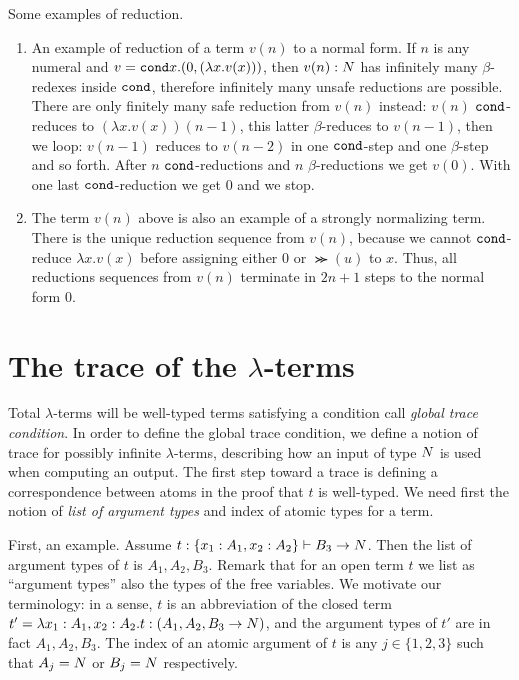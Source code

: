 \documentclass{article}
\begin{document}
Some examples of reduction.
\begin{enumerate}
\item
An example of reduction of a term $v(n)$ to a normal form. 
If $n$ is any numeral and $v = {\tt cond} x. (0, (\lambda x.v(x)) )$, then 
$v(n): {N}$ has infinitely many $\beta$-redexes inside 
${\tt cond}$, therefore infinitely many unsafe reductions are possible. There are only finitely many safe reduction
from $v(n)$ instead: $v(n)$ ${\tt cond}$-reduces to $(\lambda x.v(x))(n-1)$, 
this latter $\beta$-reduces to $v(n-1)$, 
then we loop: $v(n-1)$ reduces to $v(n-2)$ in one ${\tt cond}$-step and one $\beta$-step and so forth.
After $n$ ${\tt cond}$-reductions and 
$n$ $\beta$-reductions we get $v(0)$. With one last ${\tt cond}$-reduction we get $0$ and we stop. 
\item
The term $v(n)$ above is also an example of a strongly normalizing term.
There is the unique reduction sequence from $v(n)$, because we cannot ${\tt cond}$-reduce $\lambda x.v(x)$
before assigning either $0$ or $\Succ(u)$ to $x$. 
Thus, all reductions sequences from $v(n)$ terminate in $2n+1$ steps to the normal form $0$.
\end{enumerate}


\section{The trace of the $\lambda$-terms}
Total $\lambda$-terms will be well-typed terms satisfying a condition call \emph{global trace condition}.
In order to define the global trace condition, 
we define a notion of trace for possibly infinite $\lambda$-terms, describing how an input of type ${N}$
is used when computing an output.
The first step toward a trace is defining a correspondence between atoms in the
proof that $t$ is well-typed. We need first the notion of \emph{list of argument
 types} and index of atomic types for a term.

First, an example.
Assume $t : \{x_1:A_1, x_2:A_2\} \vdash B_3 \rightarrow {N}$. Then the list of argument types of $t$
is $A_1, A_2, B_3$. Remark that for an open term $t$ we list as ``argument types'' also the
types of the free variables. We motivate our terminology:
in a sense, $t$ is an abbreviation of the closed term $t' = \lambda  
x_1:A_1, x_2:A_2.t: (  A_1,A_2,B_3 \rightarrow {N} )$, and the argument types of $t'$ are
in fact $A_1, A_2, B_3$. 
The index of an atomic argument of $t$ is any $j \in \{1,2,3\}$ such that $A_j={N}$
or $B_j={N}$ respectively.
\end{document}
